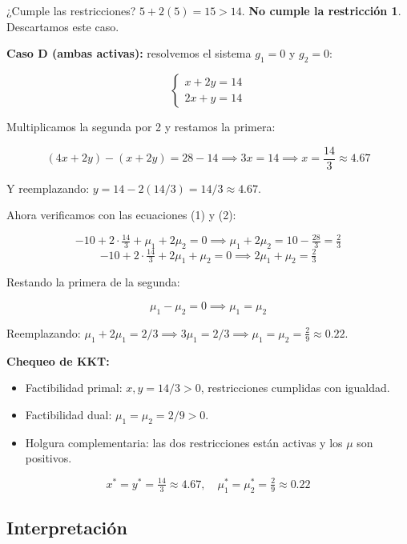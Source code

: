 \documentclass[12pt]{article}
\begin{document}
¿Cumple las restricciones? $5 + 2(5) = 15 > 14$. \textbf{No cumple la restricción 1}. Descartamos este caso.

\vspace{0.5em}

\textbf{Caso D (ambas activas):} resolvemos el sistema $g_1 = 0$ y $g_2 = 0$:

\[
\begin{cases}
x + 2y = 14 \\
2x + y = 14
\end{cases}
\]

Multiplicamos la segunda por 2 y restamos la primera:

\[
(4x + 2y) - (x + 2y) = 28 - 14 \implies 3x = 14 \implies x = \frac{14}{3} \approx 4.67
\]

Y reemplazando: $y = 14 - 2(14/3) = 14/3 \approx 4.67$.

\vspace{0.5em}

Ahora verificamos con las ecuaciones (1) y (2):

\[
-10 + 2 \cdot \tfrac{14}{3} + \mu_1 + 2\mu_2 = 0 \implies \mu_1 + 2\mu_2 = 10 - \tfrac{28}{3} = \tfrac{2}{3}
\]
\[
-10 + 2 \cdot \tfrac{14}{3} + 2\mu_1 + \mu_2 = 0 \implies 2\mu_1 + \mu_2 = \tfrac{2}{3}
\]

Restando la primera de la segunda:

\[
\mu_1 - \mu_2 = 0 \implies \mu_1 = \mu_2
\]

Reemplazando: $\mu_1 + 2\mu_1 = 2/3 \implies 3\mu_1 = 2/3 \implies \mu_1 = \mu_2 = \frac{2}{9} \approx 0.22$.

\vspace{0.5em}

\textbf{Chequeo de KKT:}
\begin{itemize}
    \item Factibilidad primal: $x, y = 14/3 > 0$, restricciones cumplidas con igualdad. \checkmark
    \item Factibilidad dual: $\mu_1 = \mu_2 = 2/9 > 0$. \checkmark
    \item Holgura complementaria: las dos restricciones están activas y los $\mu$ son positivos. \checkmark
\end{itemize}

\[
\boxed{x^* = y^* = \tfrac{14}{3} \approx 4.67, \quad \mu_1^* = \mu_2^* = \tfrac{2}{9} \approx 0.22}
\]

\subsection{Interpretación}
\end{document}
